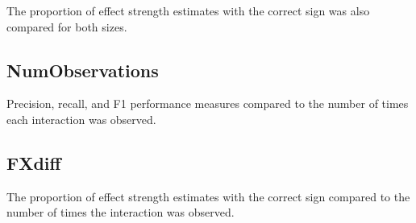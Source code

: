 \documentclass{amsart}
\begin{document}
The proportion of effect strength estimates with the correct sign was also compared for both sizes.

\subsection{NumObservations}
Precision, recall, and F1 performance measures compared to the number of times each interaction was observed.

\subsection{FXdiff}
The proportion of effect strength estimates with the correct sign compared to the number of times the interaction was observed.
\end{document}
